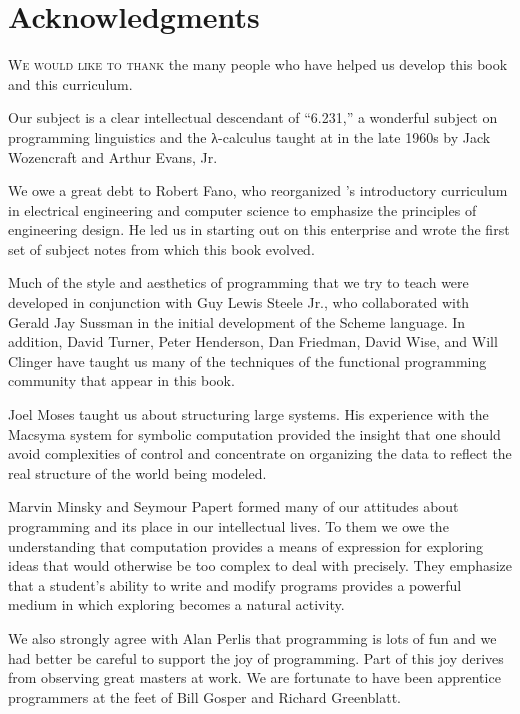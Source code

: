 \chapter*{Acknowledgments}
\label{Acknowledgments}

\lettrine{W}{e would like to thank} the many people who have helped us develop this book and
this curriculum.

Our subject is a clear intellectual descendant of ``6.231,'' a wonderful
subject on programming linguistics and the λ-calculus taught at
 in the late 1960s by Jack Wozencraft and Arthur Evans, Jr.

We owe a great debt to Robert Fano, who reorganized 's
introductory curriculum in electrical engineering and computer science to
emphasize the principles of engineering design.  He led us in starting out on
this enterprise and wrote the first set of subject notes from which this book
evolved.

Much of the style and aesthetics of programming that we try to teach were
developed in conjunction with Guy Lewis Steele Jr., who collaborated with
Gerald Jay Sussman in the initial development of the Scheme language.  In
addition, David Turner, Peter Henderson, Dan Friedman, David Wise, and Will
Clinger have taught us many of the techniques of the functional programming
community that appear in this book.

Joel Moses taught us about structuring large systems.  His experience with the
Macsyma system for symbolic computation provided the insight that one should
avoid complexities of control and concentrate on organizing the data to reflect
the real structure of the world being modeled.

Marvin Minsky and Seymour Papert formed many of our attitudes about programming
and its place in our intellectual lives.  To them we owe the understanding that
computation provides a means of expression for exploring ideas that would
otherwise be too complex to deal with precisely.  They emphasize that a
student's ability to write and modify programs provides a powerful medium in
which exploring becomes a natural activity.

We also strongly agree with Alan Perlis that programming is lots of fun and we
had better be careful to support the joy of programming.  Part of this joy
derives from observing great masters at work.  We are fortunate to have been
apprentice programmers at the feet of Bill Gosper and Richard Greenblatt.

